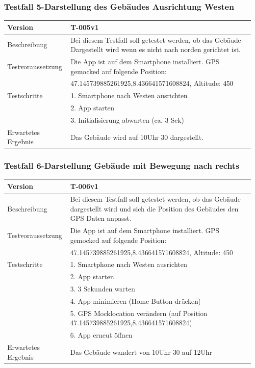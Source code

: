 \documentclass[a4paper]{scrreprt}
\begin{document}
\subsubsection{Testfall 5-Darstellung des Gebäudes Ausrichtung Westen}
\begin{tabularx}{\textwidth}{|l|X|}
\hline 
	Version &
	T-005v1 \\ 
\hline 
	Beschreibung & 
	Bei diesem Testfall soll getestet werden, ob das Gebäude Dargestellt wird wenn es nicht nach norden gerichtet ist. \\ 
\hline 
	Testvoraussetzung &
	Die App ist auf dem Smartphone installiert. GPS gemocked auf folgende Position: \\ &
		47.145739885261925,8.436641571608824, Altitude: 450 \\ 
\hline 
	Testschritte & 
		1. Smartphone nach Westen ausrichten \\ &
		2. App starten \\ &
		3. Initialisierung abwarten (ca. 3 Sek) \\
\hline
	Erwartetes Ergebnis &
	Das Gebäude wird auf 10Uhr 30 dargestellt. \\ 
\hline 
\end{tabularx}
\subsubsection{Testfall 6-Darstellung Gebäude mit Bewegung nach rechts}
\begin{tabularx}{\textwidth}{|l|X|}
\hline 
	Version &
	T-006v1 \\ 
\hline 
	Beschreibung & 
	Bei diesem Testfall soll getestet werden, ob das Gebäude dargestellt wird und sich die Position des Gebäudes den GPS Daten anpasst. \\ 
\hline 
	Testvoraussetzung &
	Die App ist auf dem Smartphone installiert. GPS gemocked auf folgende Position: \\ &
		47.145739885261925,8.436641571608824, Altitude: 450 \\ 
\hline 
	Testschritte & 
		1. Smartphone nach Westen ausrichten \\ &
		2. App starten \\ &
		3. 3 Sekunden warten \\ &
		4. App minimieren (Home Button drücken) \\ &
		5. GPS Mocklocation verändern (auf Position 47.145739885261925,8.436641571608824) \\ &
		6. App erneut öffnen \\
\hline
	Erwartetes Ergebnis &
	Das Gebäude wandert von 10Uhr 30 auf 12Uhr \\ 
\hline 
\end{tabularx}
\end{document}
